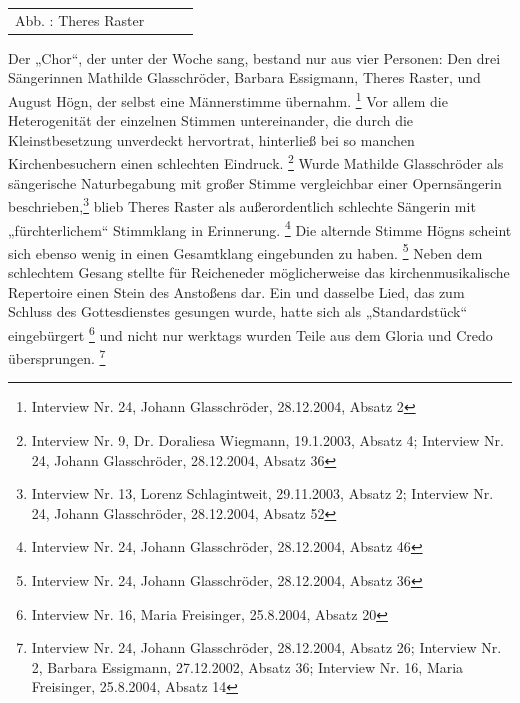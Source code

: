 \documentclass[a4paper]{article}
\newcounter{Abb}
\renewcommand\theAbb{\arabic{Abb}}
\begin{document}
\begin{flushleft}
\begin{supertabular}{m{3.5939999cm}m{4.361cm}m{4.123cm}m{3.3769999cm}}
Abb. \stepcounter{Abb}{\theAbb}: Theres Raster\\
\end{supertabular}
\end{flushleft}
Der „Chor“, der unter der Woche sang, bestand nur aus vier Personen: Den
drei Sängerinnen Mathilde Glasschröder, Barbara Essigmann, Theres
Raster, und August Högn, der selbst eine Männerstimme
übernahm. \footnote{Interview Nr. 24, Johann Glasschröder, 28.12.2004,
Absatz 2} Vor allem die Heterogenität der einzelnen Stimmen
untereinander, die durch die Kleinstbesetzung unverdeckt hervortrat,
hinterließ bei so manchen Kirchenbesuchern einen schlechten
Eindruck. \footnote{Interview Nr. 9, Dr. Doraliesa Wiegmann, 19.1.2003,
Absatz 4; Interview Nr. 24, Johann Glasschröder, 28.12.2004, Absatz 36}
Wurde Mathilde Glasschröder als sängerische Naturbegabung mit großer
Stimme vergleichbar einer Opernsängerin beschrieben,\footnote{
Interview Nr. 13, Lorenz Schlagintweit, 29.11.2003, Absatz 2; Interview
Nr. 24, Johann Glasschröder, 28.12.2004, Absatz 52} blieb Theres Raster
als außerordentlich schlechte Sängerin mit „fürchterlichem“ Stimmklang
in Erinnerung. \footnote{Interview Nr. 24, Johann Glasschröder,
28.12.2004, Absatz 46} Die alternde Stimme Högns scheint sich ebenso
wenig in einen Gesamtklang eingebunden zu haben. \footnote{Interview
Nr. 24, Johann Glasschröder, 28.12.2004, Absatz 36} Neben dem
schlechtem Gesang stellte für Reicheneder möglicherweise das
kirchenmusikalische Repertoire einen Stein des Anstoßens dar. Ein und
dasselbe Lied, das zum Schluss des Gottesdienstes gesungen wurde, hatte
sich als „Standardstück“ eingebürgert \footnote{Interview Nr. 16, Maria
Freisinger, 25.8.2004, Absatz 20} und nicht nur werktags wurden Teile
aus dem Gloria und Credo übersprungen. \footnote{Interview Nr. 24,
Johann Glasschröder, 28.12.2004, Absatz 26; Interview Nr. 2, Barbara
Essigmann, 27.12.2002, Absatz 36; Interview Nr. 16, Maria Freisinger,
25.8.2004, Absatz 14}
\end{document}
